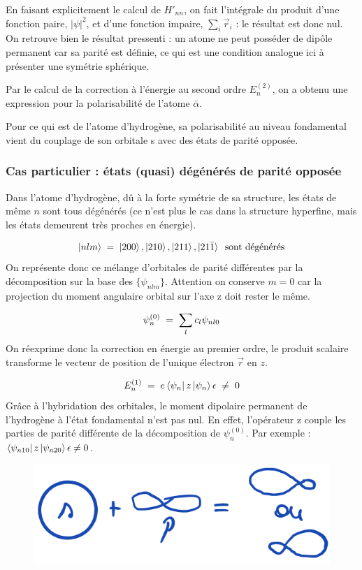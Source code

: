 En faisant explicitement le calcul de $H'_{nn}$, on fait l'intégrale du produit d'une fonction paire, $|\psi|^2$, et d'une fonction impaire, $\sum_i \vec{r}_i$ : le résultat est donc nul. On retrouve bien le résultat pressenti : un atome ne peut posséder de dipôle permanent car sa parité est définie, ce qui est une condition analogue ici à présenter une symétrie sphérique.

Par le calcul de la correction à l'énergie au second ordre $E_n^{(2)}$, on a obtenu une expression pour la polarisabilité de l'atome $\bar{\alpha}$.

Pour ce qui est de l'atome d'hydrogène, sa polarisabilité au niveau fondamental vient du couplage de son orbitale s avec des états de parité opposée.



\subsubsection{Cas particulier : états (quasi) dégénérés de parité opposée}

Dans l'atome d'hydrogène, dû à la forte symétrie de sa structure, les états de même $n$ sont tous dégénérés (ce n'est plus le cas dans la structure hyperfine, mais les états demeurent très proches en énergie).

\[
    \ket{nlm}\; = \; \ket{200},\ket{210},\ket{211},\ket{21\bar{1}}\;\;\text{sont dégénérés}
\]
On représente donc ce mélange d'orbitales de parité différentes par la décomposition sur la base des $\{\psi_{nlm}\}$. Attention on conserve $m = 0$ car la projection du moment angulaire orbital sur l'axe z doit rester le même. %

\[
    \psi_n^{(0)} \; = \; \sum_l c_l \psi_{nl0}
\]
On réexprime donc la correction en énergie au premier ordre, le produit scalaire transforme le vecteur de position de l'unique électron $\vec{r}$ en $z$.

\[
    E_n^{(1)} \; = \; e\bra{\psi_n}z\ket{\psi_n}\epsilon \;\neq \; 0
\]
Grâce à l'hybridation des orbitales, le moment dipolaire permanent de l'hydrogène à l'état fondamental n'est pas nul. En effet, l'opérateur z couple les parties de parité différente de la décomposition de $\psi_n^{(0)}$. Par exemple : $\bra{\psi_{n10}}z\ket{\psi_{n20}}\epsilon \neq 0$.\\

\begin{figure}[H]
    \centering
    \includegraphics[scale=0.5]{Images2/hybridation.png}
\end{figure}

